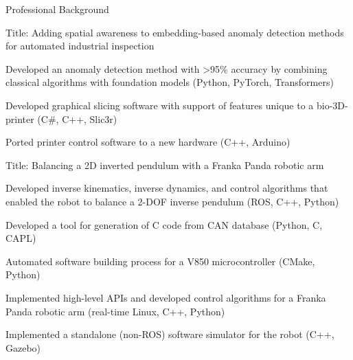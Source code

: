 \documentclass[12pt]{article} %
\begin{document}
\begin{ItemizeSection}{Professional Background}
    \item {}
    \begin{ItemizeSubsection}
        \item Title: Adding spatial awareness to embedding-based anomaly detection methods for automated industrial inspection
        \item Developed an anomaly detection method with >95\% accuracy by combining classical algorithms with foundation models (Python, PyTorch, Transformers)
    \end{ItemizeSubsection}

    \item {}
    \begin{ItemizeSubsection}
        \item Developed graphical slicing software with support of features unique to a bio-3D-printer (C\#, C++, Slic3r)
        \item Ported printer control software to a new hardware (C++, Arduino)
    \end{ItemizeSubsection}

    \item {}
    \begin{ItemizeSubsection}
        \item Title: Balancing a 2D inverted pendulum with a Franka Panda robotic arm
        \item Developed inverse kinematics, inverse dynamics, and control algorithms that enabled the robot to balance a 2-DOF inverse pendulum (ROS, C++, Python)
    \end{ItemizeSubsection}

    \item {}
    \begin{ItemizeSubsection}
        \item Developed a tool for generation of C code from CAN database (Python, C, CAPL)
        \item Automated software building process for a V850 microcontroller (CMake, Python)
    \end{ItemizeSubsection}

    \item {}
    \begin{ItemizeSubsection}
        \item Implemented high-level APIs and developed control algorithms for a Franka Panda robotic arm (real-time Linux, C++, Python)
        \item Implemented a standalone (non-ROS) software simulator for the robot (C++, Gazebo)
    \end{ItemizeSubsection}
\end{ItemizeSection}
\end{document}
